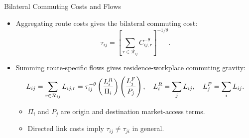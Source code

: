 \documentclass[11pt,aspectratio=169]{beamer}
\newcommand{\R}{\mathcal{R}}
\newcommand{\app}[1]{\allowbreak\hspace{0.25em}\hyperlink{#1}{\beamergotobutton{details}}}
\begin{document}
\begin{frame}[label=bilateral]{Bilateral Commuting Costs and Flows}
\begin{itemize}\small
  \item Aggregating route costs gives the bilateral commuting cost:
  \vspace{-0.5em}\begin{equation}\label{eq:bilateral}
    \tau_{ij} = \left[\sum_{r\in\R_{ij}} C_{ij,r}^{-\theta}\right]^{-1/\theta}.
  \end{equation}
  \vspace{-0.5em}
  \item Summing route-specific flows gives residence-workplace commuting gravity:
  \vspace{-0.35em}\begin{equation}\label{eq:gravity}
    L_{ij}=\sum_{r\in\R_{ij}}L_{ij,r}
    =\tau_{ij}^{-\theta}\left(\frac{L_i^R}{\Pi_i}\right)\left(\frac{L_j^F}{P_j}\right),
    \quad L_i^R=\sum_jL_{ij},\quad L_j^F=\sum_iL_{ij}.
  \vspace{-0.8em}\end{equation}
  \begin{itemize}\footnotesize
    \item $\Pi_i$ and $P_j$ are origin and destination market-access terms.
    \item Directed link costs imply $\tau_{ij}\neq\tau_{ji}$ in general. \app{approute}
  \end{itemize}
\end{itemize}
\end{frame}
\end{document}
